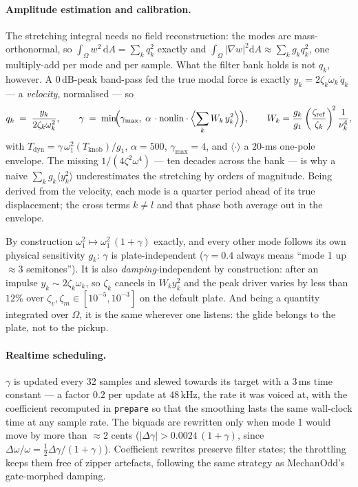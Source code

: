 \documentclass[11pt,a4paper]{article}
\newcommand{\dd}{\mathrm{d}}
\newcommand{\code}[1]{\texttt{#1}}
\begin{document}
\paragraph{Amplitude estimation and calibration.}
\label{par:driver}
The stretching integral needs no field reconstruction: the modes are
mass-orthonormal, so $\int_\Omega w^2\,\dd A = \sum_k q_k^2$ exactly and
$\int_\Omega |\nabla w|^2 \dd A \approx \sum_k g_k q_k^2$, one multiply-add
per mode and per sample. What the filter bank holds is not $q_k$, however.
A $0$\,dB-peak band-pass fed the true modal force is exactly
$y_k = 2\zeta_k\omega_k\,\dot q_k$ --- a \emph{velocity}, normalised --- so
%
\begin{equation}
  q_k \;=\; \frac{y_k}{2\zeta_k\omega_k^2},
  \qquad
  \gamma \;=\; \min\!\Bigl(\gamma_{\max},\;
        \alpha\, \cdot \mathrm{nonlin} \cdot
        \Bigl\langle \sum_k W_k\, y_k^2 \Bigr\rangle \Bigr),
  \qquad
  W_k = \frac{g_k}{g_1}
        \left(\frac{\zeta_{\mathrm{ref}}}{\zeta_k}\right)^{\!2}
        \frac{1}{\nu_k^4},
  \label{eq:gamma}
\end{equation}
%
with $T_{\mathrm{dyn}} = \gamma\, \omega_1^2(T_{\mathrm{knob}})/g_1$,
$\alpha = 500$, $\gamma_{\max}=4$, and $\langle\cdot\rangle$ a 20-ms
one-pole envelope. The missing $1/(4\zeta^2\omega^4)$ --- ten decades
across the bank --- is why a naive $\sum_k g_k\langle y_k^2\rangle$
underestimates the stretching by orders of magnitude. Being derived from
the velocity, each mode is a quarter period ahead of its true
displacement; the cross terms $k \ne l$ and that phase both average out in
the envelope.

By construction $\omega_1^2 \mapsto \omega_1^2\,(1+\gamma)$ exactly, and
every other mode follows its own physical sensitivity $g_k$: $\gamma$ is
plate-independent ($\gamma = 0.4$ always means ``mode 1 up $\approx 3$
semitones''). It is also \emph{damping}-independent by construction: after
an impulse $y_k \sim 2\zeta_k\omega_k$, so $\zeta_k$ cancels in
$W_k y_k^2$ and the peak driver varies by less than $12\%$ over
$\zeta_v, \zeta_m \in [10^{-5}, 10^{-3}]$ on the default plate. And being
a quantity integrated over $\Omega$, it is the same wherever one listens:
the glide belongs to the plate, not to the pickup.

\paragraph{Realtime scheduling.}
$\gamma$ is updated every 32 samples and slewed towards its target with a
$3$\,ms time constant --- a factor $0.2$ per update at $48$\,kHz, the rate
it was voiced at, with the coefficient recomputed in \code{prepare} so that
the smoothing lasts the same wall-clock time at any sample rate. The
biquads are rewritten only when
mode 1 would move by more than $\approx 2$ cents
($|\Delta\gamma| > 0.0024\,(1+\gamma)$, since
$\Delta\omega/\omega = \tfrac12 \Delta\gamma/(1+\gamma)$). Coefficient
rewrites preserve filter states; the throttling keeps them free of zipper
artefacts, following the same strategy as MechanOdd's gate-morphed damping.
\end{document}
